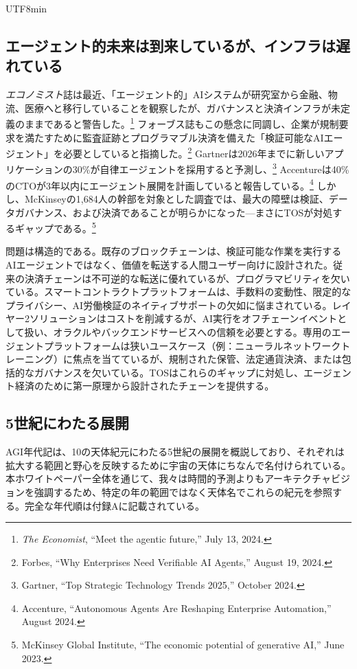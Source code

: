 \documentclass[11pt]{article}
\begin{document}
\begin{CJK}{UTF8}{min}
\subsection{エージェント的未来は到来しているが、インフラは遅れている}
\emph{エコノミスト}誌は最近、「エージェント的」AIシステムが研究室から金融、物流、医療へと移行していることを観察したが、ガバナンスと決済インフラが未定義のままであると警告した。\footnote{\emph{The Economist}, ``Meet the agentic future,'' July 13, 2024.} フォーブス誌もこの懸念に同調し、企業が規制要求を満たすために監査証跡とプログラマブル決済を備えた「検証可能なAIエージェント」を必要としていると指摘した。\footnote{Forbes, ``Why Enterprises Need Verifiable AI Agents,'' August 19, 2024.} Gartnerは2026年までに新しいアプリケーションの30\%が自律エージェントを採用すると予測し、\footnote{Gartner, ``Top Strategic Technology Trends 2025,'' October 2024.} Accentureは40\%のCTOが3年以内にエージェント展開を計画していると報告している。\footnote{Accenture, ``Autonomous Agents Are Reshaping Enterprise Automation,'' August 2024.} しかし、McKinseyの1,684人の幹部を対象とした調査では、最大の障壁は検証、データガバナンス、および決済であることが明らかになった---まさにTOSが対処するギャップである。\footnote{McKinsey Global Institute, ``The economic potential of generative AI,'' June 2023.}

問題は構造的である。既存のブロックチェーンは、検証可能な作業を実行するAIエージェントではなく、価値を転送する人間ユーザー向けに設計された。従来の決済チェーンは不可逆的な転送に優れているが、プログラマビリティを欠いている。スマートコントラクトプラットフォームは、手数料の変動性、限定的なプライバシー、AI労働検証のネイティブサポートの欠如に悩まされている。レイヤー2ソリューションはコストを削減するが、AI実行をオフチェーンイベントとして扱い、オラクルやバックエンドサービスへの信頼を必要とする。専用のエージェントプラットフォームは狭いユースケース（例：ニューラルネットワークトレーニング）に焦点を当てているが、規制された保管、法定通貨決済、または包括的なガバナンスを欠いている。TOSはこれらのギャップに対処し、エージェント経済のために第一原理から設計されたチェーンを提供する。

\subsection{5世紀にわたる展開}
AGI年代記は、10の天体紀元にわたる5世紀の展開を概説しており、それぞれは拡大する範囲と野心を反映するために宇宙の天体にちなんで名付けられている。本ホワイトペーパー全体を通じて、我々は時間的予測よりもアーキテクチャビジョンを強調するため、特定の年の範囲ではなく天体名でこれらの紀元を参照する。完全な年代順は付録Aに記載されている。


\end{CJK}
\end{document}

